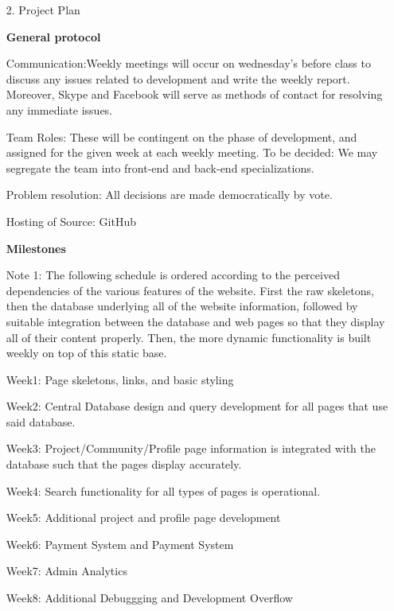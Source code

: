 \documentclass[12pt]{article}
\begin{document}
\begin{enumerate}
\item[2.] Project Plan

\textbf{General protocol}

Communication:Weekly meetings will occur on wednesday's before class to discuss any issues related to development and write the weekly report. Moreover, Skype and Facebook will serve as methods of contact for resolving any immediate issues.

Team Roles: These will be contingent on the phase of development, and assigned for the given week at each weekly meeting. To be decided: We may segregate the team into front-end and back-end specializations.

Problem resolution: All decisions are made democratically by vote.

Hosting of Source: GitHub

\textbf{Milestones}

Note 1: The following schedule is ordered according to the perceived dependencies of the various features of the website. First the raw skeletons, then the database underlying all of the website information, followed by suitable integration between the database and web pages so that they display all of their content properly. Then, the more dynamic functionality is built weekly on top of this static base. 

Week1: Page skeletons, links, and basic styling

Week2: Central Database design and query development for all pages that use said database.

Week3: Project/Community/Profile page information is integrated with the database such that the pages display accurately.

Week4: Search functionality for all types of pages is operational.

Week5: Additional project and profile page development

Week6: Payment System and Payment System

Week7: Admin Analytics

Week8: Additional Debuggging and Development Overflow


\end{enumerate}
\end{document}
